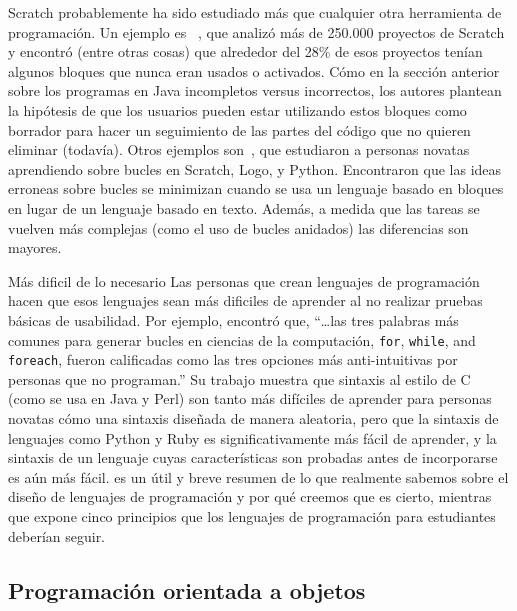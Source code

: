 
Scratch probablemente ha sido estudiado más que cualquier otra herramienta de programación.
Un ejemplo es ~\cite{Aiva2016},
que analizó más de 250.000 proyectos de Scratch
y encontró (entre otras cosas) que alrededor del 28\% de esos proyectos tenían algunos bloques que nunca eran usados o activados.
Cómo en la sección anterior sobre los programas en Java incompletos versus incorrectos,
los autores plantean la hipótesis de que los usuarios pueden estar utilizando estos bloques como borrador
para hacer un seguimiento de las partes del código que no quieren eliminar (todavía).
Otros ejemplos son~\cite{Grov2017,Mlad2017},
que estudiaron a personas novatas aprendiendo sobre bucles en Scratch, Logo, y Python.
Encontraron que las ideas erroneas sobre bucles se minimizan cuando se usa un lenguaje basado en bloques
en lugar de un lenguaje basado en texto.
Además,
a medida que las tareas se vuelven más complejas (como el uso de bucles anidados)
las diferencias son mayores.

\begin{aside}{Más dificil de lo necesario}
  Las personas que crean lenguajes de programación hacen que esos lenguajes sean más dificiles de aprender al no realizar pruebas básicas de usabilidad.
  Por ejemplo,
  \cite{Stef2013} encontró que,
  ``{\ldots}las tres palabras más comunes para generar bucles en ciencias de la computación,
  \texttt{for}, \texttt{while}, and \texttt{foreach},
  fueron calificadas como las tres opciones más anti-intuitivas por personas que no programan.''
  Su trabajo muestra que sintaxis al estilo de C (como se usa en Java y Perl)
  son tanto más difíciles de aprender para personas novatas cómo una sintaxis diseñada de manera aleatoria,
  pero que la sintaxis de lenguajes como Python y Ruby
  es significativamente más fácil de aprender,
  y la sintaxis de un lenguaje cuyas características son probadas antes de incorporarse es aún más fácil.
  \cite{Stef2017} es un útil y breve resumen de lo que realmente sabemos sobre el diseño de lenguajes de programación
  y por qué creemos que es cierto,
  mientras que \cite{Guzd2016} expone cinco principios que los lenguajes de programación para estudiantes deberían seguir.
\end{aside}

\subsection*{Programación orientada a objetos}

